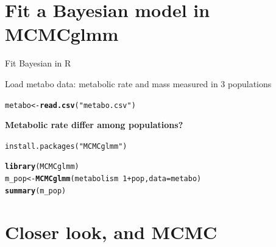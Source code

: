 \documentclass[10pt]{beamer}\usepackage[]{graphicx}\usepackage[]{color}
\makeatletter
\newcommand{\hlnum}[1]{\textcolor[rgb]{0.686,0.059,0.569}{#1}}%
\newcommand{\hlstr}[1]{\textcolor[rgb]{0.192,0.494,0.8}{#1}}%
\newcommand{\hlopt}[1]{\textcolor[rgb]{0,0,0}{#1}}%
\newcommand{\hlstd}[1]{\textcolor[rgb]{0.345,0.345,0.345}{#1}}%
\newcommand{\hlkwb}[1]{\textcolor[rgb]{0.69,0.353,0.396}{#1}}%
\newcommand{\hlkwc}[1]{\textcolor[rgb]{0.333,0.667,0.333}{#1}}%
\newcommand{\hlkwd}[1]{\textcolor[rgb]{0.737,0.353,0.396}{\textbf{#1}}}%
\newenvironment{kframe}{%
 \def\at@end@of@kframe{}%
 \ifinner\ifhmode%
  \def\at@end@of@kframe{\end{minipage}}%
  \begin{minipage}{\columnwidth}%
 \fi\fi%
 \def\FrameCommand##1{\hskip\@totalleftmargin \hskip-\fboxsep
 \colorbox{shadecolor}{##1}\hskip-\fboxsep
     \hskip-\linewidth \hskip-\@totalleftmargin \hskip\columnwidth}%
 \MakeFramed {\advance\hsize-\width
   \@totalleftmargin\z@ \linewidth\hsize
   \@setminipage}}%
 {\par\unskip\endMakeFramed%
 \at@end@of@kframe}
\newenvironment{knitrout}{}{} %
\makeatother
\begin{document}
\section{Fit a Bayesian model in MCMCglmm}

\begin{frame}[fragile]{Fit Bayesian in R}



Load metabo data: metabolic rate and mass measured in 3 populations
\begin{knitrout}\small
{}\color{fgcolor}\begin{kframe}
\begin{alltt}
\hlstd{metabo} \hlkwb{<-} \hlkwd{read.csv}\hlstd{(}\hlstr{"metabo.csv"}\hlstd{)}
\end{alltt}
\end{kframe}
\end{knitrout}
\textbf{Metabolic rate differ among populations?}

\pause 

\texttt{install.packages("MCMCglmm")}

\begin{knitrout}\small
{}\color{fgcolor}\begin{kframe}
\begin{alltt}
\hlkwd{library}\hlstd{(MCMCglmm)}
\hlstd{m_pop} \hlkwb{<-} \hlkwd{MCMCglmm}\hlstd{(metabolism} \hlopt{~} \hlnum{1} \hlopt{+} \hlstd{pop,} \hlkwc{data} \hlstd{= metabo)}
\hlkwd{summary}\hlstd{(m_pop)}
\end{alltt}
\end{kframe}
\end{knitrout}

\end{frame}


\section{Closer look, and MCMC}
\end{document}
